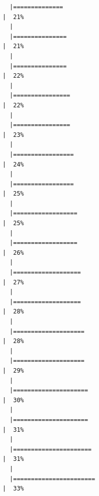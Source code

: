 \documentclass[
  letterpaper,
  DIV=11,
  numbers=noendperiod]{scrreprt}
\begin{document}
\begin{verbatim}
  |==============                                                        |  21%
  |                                                                            
  |===============                                                       |  21%
  |                                                                            
  |===============                                                       |  22%
  |                                                                            
  |================                                                      |  22%
  |                                                                            
  |================                                                      |  23%
  |                                                                            
  |=================                                                     |  24%
  |                                                                            
  |=================                                                     |  25%
  |                                                                            
  |==================                                                    |  25%
  |                                                                            
  |==================                                                    |  26%
  |                                                                            
  |===================                                                   |  27%
  |                                                                            
  |===================                                                   |  28%
  |                                                                            
  |====================                                                  |  28%
  |                                                                            
  |====================                                                  |  29%
  |                                                                            
  |=====================                                                 |  30%
  |                                                                            
  |=====================                                                 |  31%
  |                                                                            
  |======================                                                |  31%
  |                                                                            
  |=======================                                               |  33%

\end{verbatim}
\end{document}
